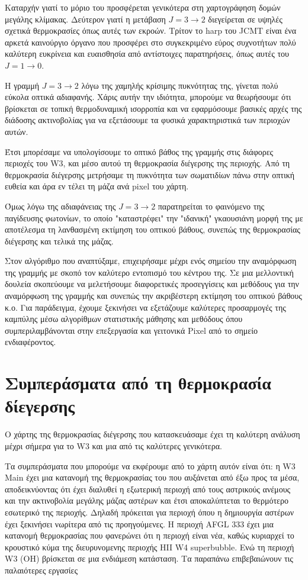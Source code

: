 \documentclass[a4paper,12pt]{memoir}
\begin{document}
Καταρχήν γιατί το μόριο του  προσφέρεται γενικότερα στη χαρτογράφηση δομών μεγάλης κλίμακας. Δεύτερον γιατί η μετάβαση $J=3\to 2$ διεγείρεται σε υψηλές σχετικά θερμοκρασίες όπως αυτές των εκροών. Τρίτον το harp του JCMT είναι ένα αρκετά καινούργιο όργανο που προσφέρει στο συγκεκριμένο εύρος συχνοτήτων πολύ καλύτερη ευκρίνεια και ευαισθησία από αντίστοιχες παρατηρήσεις, όπως αυτές του  $J=1\to 0$.

Η γραμμή  $J=3\to 2$ λόγω της χαμηλής κρίσιμης πυκνότητας της, γίνεται πολύ εύκολα οπτικά αδιαφανής. Χάρις αυτήν την ιδιότητα, μπορούμε να θεωρήσουμε ότι βρίσκεται σε τοπική θερμοδυναμική ισορροπία και να εφαρμόσουμε βασικές αρχές της διάδοσης ακτινοβολίας για να εξετάσουμε τα φυσικά χαρακτηριστικά των περιοχών αυτών. 

Έτσι μπορέσαμε να υπολογίσουμε το οπτικό βάθος της γραμμής στις διάφορες περιοχές του W3, και μέσο αυτού τη θερμοκρασία διέγερσης της περιοχής.
Από τη θερμοκρασία διέγερσης μετρήσαμε τη πυκνότητα των σωματιδίων πάνω στην οπτική ευθεία και άρα εν τέλει τη μάζα ανά pixel του χάρτη.

Όμως λόγω της αδιαφάνειας της  $J=3\to 2$ παρατηρείται το φαινόμενο της παγίδευσης φωτονίων, το οποίο "καταστρέφει" την "ιδανική" γκαουσιάνη μορφή της με αποτέλεσμα τη λανθασμένη εκτίμηση του οπτικού βάθους, συνεπώς της θερμοκρασίας διέγερσης και τελικά της μάζας.

Στον αλγόριθμο που αναπτύξαμε, επιχειρήσαμε μέχρι ενός σημείου την αναμόρφωση της γραμμής  με σκοπό τον καλύτερο εντοπισμό του κέντρου της. Σε μια μελλοντική δουλεία σκοπεύουμε να μελετήσουμε διαφορετικές προσεγγίσεις και μεθόδους για την αναμόρφωση της γραμμής και συνεπώς την ακριβέστερη εκτίμηση του οπτικού βάθους κ.ο. Για παράδειγμα, έχουμε ξεκινήσει να εξετάζουμε καλύτερες προσαρμογές της καμπύλης μέσω αλγορίθμων στατιστικής μάθησης και μεθόδους όπου συμπεριλαμβάνονται στην επεξεργασία και γειτονικά Pixel από το σημείο ενδιαφέροντος.  

\section*{Συμπεράσματα από τη θερμοκρασία δίεγερσης}

Ο χάρτης της θερμοκρασίας διέγερσης που κατασκευάσαμε έχει τη καλύτερη ανάλυση μέχρι σήμερα για το W3 και μια από τις καλύτερες γενικότερα.

Τα συμπεράσματα που μπορούμε να εκφέρουμε από το χάρτη αυτόν είναι ότι: η W3 Main έχει μια κατανομή της θερμοκρασίας του που αυξάνεται από έξω προς τα μέσα, αποδεικνύοντας ότι έχει διαλυθεί η εξωτερική περιοχή από τους αστρικούς ανέμους και την ακτινοβολία μεγάλης μάζας αστέρων και έτσι αποκαλύπτεται το θερμότερο εσωτερικό της περιοχής. Δηλαδή πρόκειται για περιοχή όπου η δημιουργία αστέρων έχει ξεκινήσει νωρίτερα από τις προηγούμενες. Η περιοχή AFGL 333 έχει μια κατανομή θερμοκρασίας που φανερώνει ότι η περιοχή είναι νέα, καθώς κυριαρχεί το κρουστικό κύμα της διευρυνομενης περιοχής HII W4 superbubble. Ενώ τη περιοχή W3 (OH) βρίσκεται σε μια ενδιάμεση κατάσταση. 
Τα παραπάνω επιβεβαιώνουν τις παλαιότερες εργασίες \cite{polychroni_gas_2012,sakai_2005}
\end{document}
